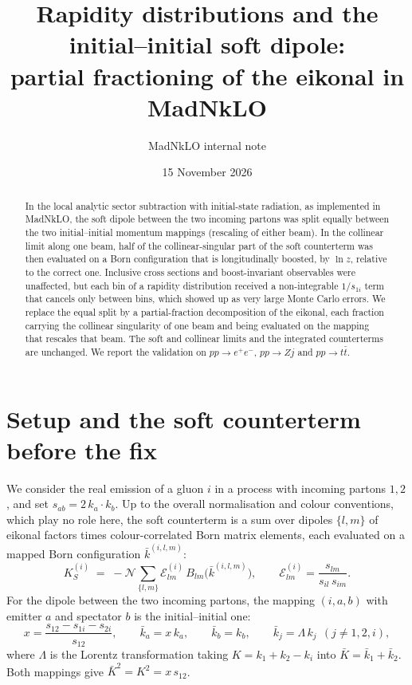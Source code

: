 \documentclass[11pt,a4paper]{article}
\title{Rapidity distributions and the initial--initial soft dipole:\\
       partial fractioning of the eikonal in MadNkLO}
\author{MadNkLO internal note}
\date{15 November 2026}
\newcommand{\kb}{\bar k}
\newcommand{\Nc}{\mathcal N}
\newcommand{\E}{\mathcal E}
\begin{document}
\maketitle

\begin{abstract}
In the local analytic sector subtraction with initial-state radiation, as
implemented in MadNkLO, the soft dipole between the two incoming partons was
split equally between the two initial--initial momentum mappings (rescaling of
either beam). In the collinear limit along one beam, half of the
collinear-singular part of the soft counterterm was then evaluated on a Born
configuration that is longitudinally boosted, by $\ln z$, relative to the
correct one. Inclusive cross sections and boost-invariant observables were
unaffected, but each bin of a rapidity distribution received a
non-integrable $1/s_{1i}$ term that cancels only between bins, which showed up
as very large Monte Carlo errors. We replace the equal split by a
partial-fraction decomposition of the eikonal, each fraction carrying the
collinear singularity of one beam and being evaluated on the mapping that
rescales that beam. The soft and collinear limits and the integrated
counterterms are unchanged. We report the validation on $pp\to e^+e^-$,
$pp\to Zj$ and $pp\to t\bar t$.
\end{abstract}

\section{Setup and the soft counterterm before the fix}

We consider the real emission of a gluon $i$ in a process with incoming partons
$1,2$, and set $s_{ab}=2\,k_a\cdot k_b$. Up to the overall normalisation and
colour conventions, which play no role here, the soft counterterm is a sum over
dipoles $\{l,m\}$ of eikonal factors times colour-correlated Born matrix
elements, each evaluated on a mapped Born configuration $\kb^{(i,l,m)}$:
\begin{equation}
  K_S^{(i)} \;=\; -\Nc \sum_{\{l,m\}} \E^{(i)}_{lm}\,
  B_{lm}\big(\kb^{(i,l,m)}\big),
  \qquad
  \E^{(i)}_{lm} = \frac{s_{lm}}{s_{il}\,s_{im}} .
  \label{eq:KS}
\end{equation}
For the dipole between the two incoming partons, the mapping $(i,a,b)$ with
emitter $a$ and spectator $b$ is the initial--initial one:
\begin{equation}
  x = \frac{s_{12}-s_{1i}-s_{2i}}{s_{12}},\qquad
  \kb_a = x\,k_a,\qquad \kb_b = k_b,\qquad
  \kb_j = \Lambda\,k_j \ \ (j\neq 1,2,i),
  \label{eq:FII}
\end{equation}
where $\Lambda$ is the Lorentz transformation taking
$K=k_1+k_2-k_i$ into $\bar K = \kb_1+\kb_2$. Both mappings give
$\bar K^2 = K^2 = x\,s_{12}$.
\end{document}
